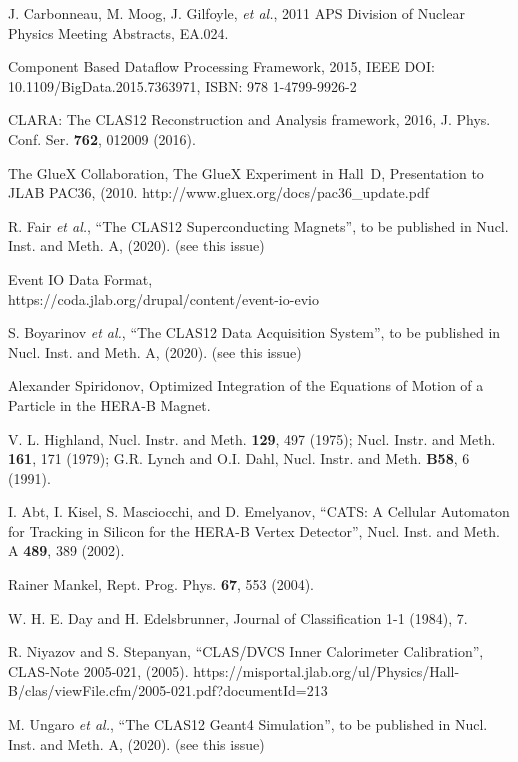 \documentclass[3p,times,twocolumn]{elsarticle}
\begin{document}
\begin{thebibliography}{99}
J. Carbonneau, M. Moog,  J. Gilfoyle, {\it et al.}, 2011 APS Division of Nuclear Physics Meeting Abstracts, EA.024.

Component Based Dataflow Processing Framework, 2015, IEEE DOI: 10.1109/BigData.2015.7363971,
ISBN: 978 1-4799-9926-2

CLARA: The CLAS12 Reconstruction and Analysis framework, 2016, J. Phys. Conf. Ser. {\bf 762}, 012009 (2016).

The GlueX Collaboration, The GlueX Experiment in Hall~D, Presentation to JLAB PAC36, (2010.
http://www.gluex.org/docs/pac36\_update.pdf

R. Fair {\it et al.}, ``The CLAS12 Superconducting Magnets'', to be published in Nucl. Inst.
and Meth. A, (2020). (see this issue)

Event IO Data Format, \\ https://coda.jlab.org/drupal/content/event-io-evio

S. Boyarinov {\it et al.}, ``The CLAS12 Data Acquisition System'', to be published in Nucl. Inst. and
Meth. A, (2020). (see this issue)

Alexander Spiridonov, Optimized Integration of the Equations of Motion of a Particle in the HERA-B Magnet.

V. L. Highland, Nucl. Instr. and Meth. {\bf 129}, 497 (1975); Nucl. Instr. and Meth. {\bf 161}, 171 (1979);
G.R. Lynch and O.I. Dahl, Nucl. Instr. and Meth. {\bf B58}, 6 (1991).

I. Abt, I. Kisel, S. Masciocchi, and D. Emelyanov, ``CATS: A Cellular Automaton for Tracking in Silicon for the
HERA-B Vertex Detector'', Nucl. Inst. and Meth. A {\bf 489}, 389 (2002).

Rainer Mankel, Rept. Prog. Phys. {\bf 67}, 553 (2004).

W. H. E. Day and H. Edelsbrunner, Journal of Classification 1-1 (1984), 7. 

R. Niyazov and S. Stepanyan, ``CLAS/DVCS Inner Calorimeter Calibration'', CLAS-Note 2005-021, (2005).
https://misportal.jlab.org/ul/Physics/Hall-B/clas/viewFile.cfm/2005-021.pdf?documentId=213

M. Ungaro {\it et al.},  ``The CLAS12 Geant4 Simulation'', to be published in Nucl. Inst. and Meth. A, (2020).
(see this issue)


\end{thebibliography}
\end{document}
